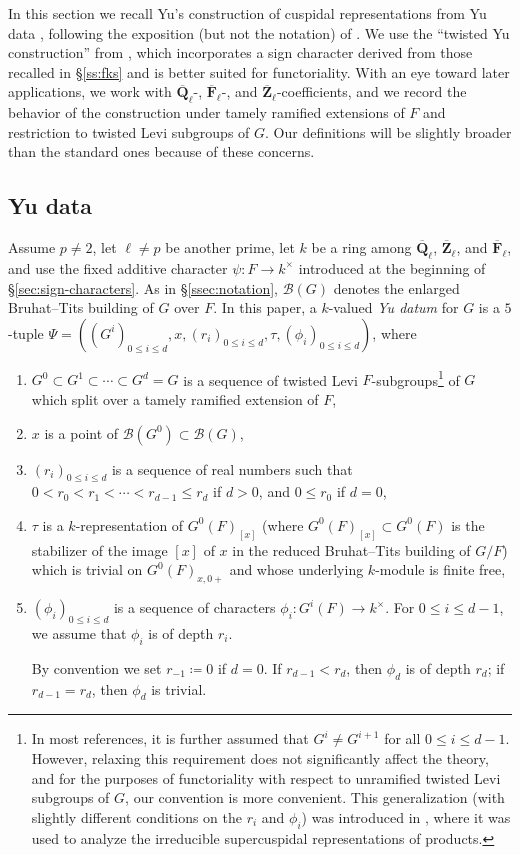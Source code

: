\documentclass[reqno]{amsart}
\numberwithin{equation}{subsection}
\newcommand{\F}{\mathbf{F}}
\newcommand{\Q}{\mathbf{Q}}
\newcommand{\Z}{\mathbf{Z}}
\newcommand{\ol}[1]{\overline{#1}}
\newcommand{\co}{\colon}
\newcommand\cB{\mathcal{B}}
\theoremstyle{remark}
\numberwithin{equation}{subsection}
\numberwithin{figure}{subsection}
\begin{document}
In this section we recall Yu's construction of cuspidal representations from Yu data \cite{Yu01}, following the exposition (but not the notation) of \cite{Fin21b}. We use the ``twisted Yu construction'' from \cite{FKS23}, which incorporates a sign character derived from those recalled in \S\ref{ss:fks} and is better suited for functoriality. With an eye toward later applications, we work with $\ol\Q_\ell$-, $\ol\F_\ell$-, and $\ol\Z_\ell$-coefficients, and we record the behavior of the construction under tamely ramified extensions of $F$ and restriction to twisted Levi subgroups of $G$. Our definitions will be slightly broader than the standard ones because of these concerns.

\subsection{Yu data}\label{sss:yu-data}
Assume $p \neq 2$, let $\ell \neq p$ be another prime, let $k$ be a ring among $\ol\Q_\ell$, $\ol\Z_\ell$, and $\ol\F_\ell$, and use the fixed additive character $\psi\co F \to k^\times$ introduced at the beginning of \S \ref{sec:sign-characters}. As in \S\ref{ssec:notation}, $\cB(G)$ denotes the enlarged Bruhat--Tits building of \(G\) over \(F\). In this paper, a $k$-valued \textit{Yu datum} for $G$ is a $5$-tuple $\Psi = ((G^i)_{0 \leq i \leq d}, x, (r_i)_{0 \leq i \leq d}, \tau, (\phi_i)_{0 \leq i \leq d})$, where
\begin{enumerate}[label=(\alph*)]
\item $G^0 \subset G^1 \subset \cdots \subset G^d = G$ is a sequence of twisted Levi $F$-subgroups\footnote{In most references, it is further assumed that $G^i \neq G^{i+1}$ for all $0 \leq i \leq d-1$. However, relaxing this requirement does not significantly affect the theory, and for the purposes of functoriality with respect to unramified twisted Levi subgroups of $G$, our convention is more convenient. This generalization (with slightly different conditions on the $r_i$ and $\phi_i$) was introduced in \cite[\S 15]{Yu01}, where it was used to analyze the irreducible supercuspidal representations of products.} of $G$ which split over a tamely ramified extension of $F$,
\item $x$ is a point of $\cB(G^0) \subset \cB(G)$,
\item $(r_i)_{0 \leq i \leq d}$ is a sequence of real numbers such that $0 < r_0 < r_1 < \cdots < r_{d-1} \leq r_d$ if $d > 0$, and $0 \leq r_0$ if $d = 0$,
\item $\tau$ is a $k$-representation of $G^0(F)_{[x]}$ (where $G^0(F)_{[x]} \subset G^0(F)$ is the stabilizer of the image $[x]$ of $x$ in the reduced Bruhat--Tits building of $G/F$) which is trivial on $G^0(F)_{x, 0+}$ and whose underlying $k$-module is finite free,
\item $(\phi_i)_{0 \leq i \leq d}$ is a sequence of characters $\phi_i\colon G^i(F) \to k^\times$. For $0 \leq i \leq d-1$, we assume that $\phi_i$ is of depth $r_i$. 

By convention we set $r_{-1}\coloneqq0$ if $d=0$. If $r_{d-1}<r_d$, then $\phi_d$ is of depth $r_d$; if $r_{d-1}=r_d$, then $\phi_d$ is trivial.
\end{enumerate}
\end{document}
